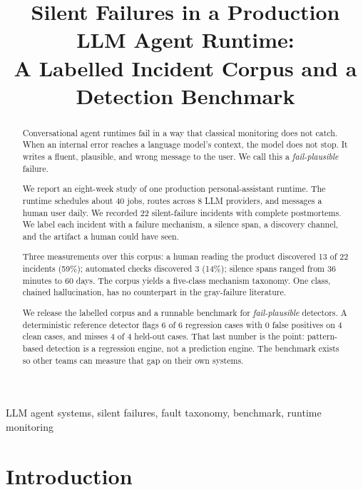 \documentclass[conference]{IEEEtran}
\newcommand{\failplausible}{\emph{fail-plausible}}
\begin{document}
\title{Silent Failures in a Production LLM Agent Runtime:\\
A Labelled Incident Corpus and a Detection Benchmark}

\author{
}

\maketitle

\begin{abstract}
Conversational agent runtimes fail in a way that classical monitoring does
not catch. When an internal error reaches a language model's context, the
model does not stop. It writes a fluent, plausible, and wrong message to the
user. We call this a \failplausible{} failure.

We report an eight-week study of one production personal-assistant runtime.
The runtime schedules about 40 jobs, routes across 8 LLM providers, and
messages a human user daily. We recorded 22 silent-failure incidents with
complete postmortems. We label each incident with a failure mechanism, a
silence span, a discovery channel, and the artifact a human could have seen.

Three measurements over this corpus: a human reading the product discovered
13 of 22 incidents (59\%); automated checks discovered 3 (14\%); silence
spans ranged from 36 minutes to 60 days. The corpus yields a five-class
mechanism taxonomy. One class, chained hallucination, has no counterpart in
the gray-failure literature.

We release the labelled corpus and a runnable benchmark for \failplausible{}
detectors. A deterministic reference detector flags 6 of 6 regression cases
with 0 false positives on 4 clean cases, and misses 4 of 4 held-out cases.
That last number is the point: pattern-based detection is a regression
engine, not a prediction engine. The benchmark exists so other teams can
measure that gap on their own systems.
\end{abstract}

\begin{IEEEkeywords}
LLM agent systems, silent failures, fault taxonomy, benchmark, runtime
monitoring
\end{IEEEkeywords}

\section{Introduction}
\end{document}
